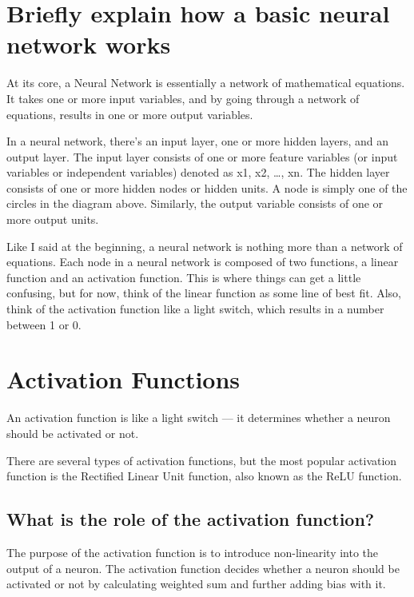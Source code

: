 \documentclass[
]{book}
\begin{document}
\hypertarget{briefly-explain-how-a-basic-neural-network-works}{%
\section{Briefly explain how a basic neural network works}\label{briefly-explain-how-a-basic-neural-network-works}}

At its core, a Neural Network is essentially a network of mathematical equations. It takes one or more input variables, and by going through a network of equations, results in one or more output variables.

In a neural network, there's an input layer, one or more hidden layers, and an output layer. The input layer consists of one or more feature variables (or input variables or independent variables) denoted as x1, x2, \ldots, xn. The hidden layer consists of one or more hidden nodes or hidden units. A node is simply one of the circles in the diagram above. Similarly, the output variable consists of one or more output units.

Like I said at the beginning, a neural network is nothing more than a network of equations. Each node in a neural network is composed of two functions, a linear function and an activation function. This is where things can get a little confusing, but for now, think of the linear function as some line of best fit. Also, think of the activation function like a light switch, which results in a number between 1 or 0.

\hypertarget{activation-functions}{%
\section{Activation Functions}\label{activation-functions}}

An activation function is like a light switch --- it determines whether a neuron should be activated or not.

There are several types of activation functions, but the most popular activation function is the Rectified Linear Unit function, also known as the ReLU function.

\hypertarget{what-is-the-role-of-the-activation-function}{%
\subsection{What is the role of the activation function?}\label{what-is-the-role-of-the-activation-function}}

The purpose of the activation function is to introduce non-linearity into the output of a neuron. The activation function decides whether a neuron should be activated or not by calculating weighted sum and further adding bias with it.
\end{document}
